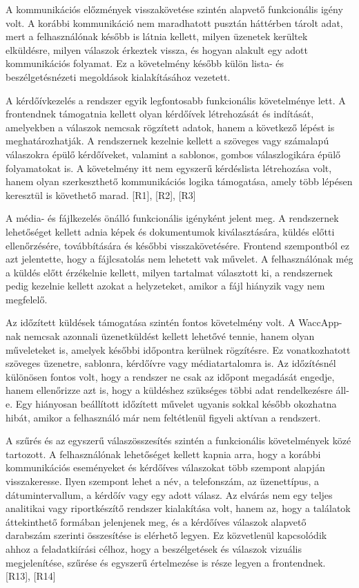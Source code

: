 A kommunikációs előzmények visszakövetése szintén alapvető funkcionális igény volt. A korábbi kommunikáció nem maradhatott pusztán háttérben tárolt adat, mert a felhasználónak később is látnia kellett, milyen üzenetek kerültek elküldésre, milyen válaszok érkeztek vissza, és hogyan alakult egy adott kommunikációs folyamat. Ez a követelmény később külön lista- és beszélgetésnézeti megoldások kialakításához vezetett.

A kérdőívkezelés a rendszer egyik legfontosabb funkcionális követelménye lett. A frontendnek támogatnia kellett olyan kérdőívek létrehozását és indítását, amelyekben a válaszok nemcsak rögzített adatok, hanem a következő lépést is meghatározhatják. A rendszernek kezelnie kellett a szöveges vagy számalapú válaszokra épülő kérdőíveket, valamint a sablonos, gombos válaszlogikára épülő folyamatokat is. A követelmény itt nem egyszerű kérdéslista létrehozása volt, hanem olyan szerkeszthető kommunikációs logika támogatása, amely több lépésen keresztül is követhető marad. [R1], [R2], [R3]

A média- és fájlkezelés önálló funkcionális igényként jelent meg. A rendszernek lehetőséget kellett adnia képek és dokumentumok kiválasztására, küldés előtti ellenőrzésére, továbbítására és későbbi visszakövetésére. Frontend szempontból ez azt jelentette, hogy a fájlcsatolás nem lehetett vak művelet. A felhasználónak még a küldés előtt érzékelnie kellett, milyen tartalmat választott ki, a rendszernek pedig kezelnie kellett azokat a helyzeteket, amikor a fájl hiányzik vagy nem megfelelő.

Az időzített küldések támogatása szintén fontos követelmény volt. A WaccApp-nak nemcsak azonnali üzenetküldést kellett lehetővé tennie, hanem olyan műveleteket is, amelyek későbbi időpontra kerülnek rögzítésre. Ez vonatkozhatott szöveges üzenetre, sablonra, kérdőívre vagy médiatartalomra is. Az időzítésnél különösen fontos volt, hogy a rendszer ne csak az időpont megadását engedje, hanem ellenőrizze azt is, hogy a küldéshez szükséges többi adat rendelkezésre áll-e. Egy hiányosan beállított időzített művelet ugyanis sokkal később okozhatna hibát, amikor a felhasználó már nem feltétlenül figyeli aktívan a rendszert.

A szűrés és az egyszerű válaszösszesítés szintén a funkcionális követelmények közé tartozott. A felhasználónak lehetőséget kellett kapnia arra, hogy a korábbi kommunikációs eseményeket és kérdőíves válaszokat több szempont alapján visszakeresse. Ilyen szempont lehet a név, a telefonszám, az üzenettípus, a dátumintervallum, a kérdőív vagy egy adott válasz. Az elvárás nem egy teljes analitikai vagy riportkészítő rendszer kialakítása volt, hanem az, hogy a találatok áttekinthető formában jelenjenek meg, és a kérdőíves válaszok alapvető darabszám szerinti összesítése is elérhető legyen. Ez közvetlenül kapcsolódik ahhoz a feladatkiírási célhoz, hogy a beszélgetések és válaszok vizuális megjelenítése, szűrése és egyszerű értelmezése is része legyen a frontendnek. [R13], [R14]

